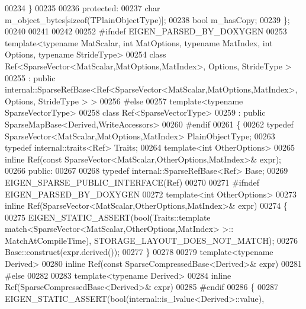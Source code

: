 \begin{DoxyCode}
00234     \}
00235 
00236   \textcolor{keyword}{protected}:
00237     \textcolor{keywordtype}{char} m\_object\_bytes[\textcolor{keyword}{sizeof}(TPlainObjectType)];
00238     \textcolor{keywordtype}{bool} m\_hasCopy;
00239 \};
00240 
00241 
00242 
00252 \textcolor{preprocessor}{#ifndef EIGEN\_PARSED\_BY\_DOXYGEN}
00253 \textcolor{keyword}{template}<\textcolor{keyword}{typename} MatScalar, \textcolor{keywordtype}{int} MatOptions, \textcolor{keyword}{typename} MatIndex, \textcolor{keywordtype}{int} Options, \textcolor{keyword}{typename} Str\textcolor{keywordtype}{id}eType>
00254 \textcolor{keyword}{class }Ref<SparseVector<MatScalar,MatOptions,MatIndex>, Options, StrideType >
00255   : \textcolor{keyword}{public} internal::SparseRefBase<Ref<SparseVector<MatScalar,MatOptions,MatIndex>, Options, StrideType > >
00256 \textcolor{preprocessor}{#else}
00257 template<typename SparseVectorType>
00258 class Ref<SparseVectorType>
00259   : \textcolor{keyword}{public} SparseMapBase<Derived,WriteAccessors>
00260 \textcolor{preprocessor}{#endif}
00261 \{
00262     \textcolor{keyword}{typedef} SparseVector<MatScalar,MatOptions,MatIndex> PlainObjectType;
00263     \textcolor{keyword}{typedef} internal::traits<Ref> Traits;
00264     \textcolor{keyword}{template}<\textcolor{keywordtype}{int} OtherOptions>
00265     \textcolor{keyword}{inline} Ref(\textcolor{keyword}{const} SparseVector<MatScalar,OtherOptions,MatIndex>& expr);
00266   \textcolor{keyword}{public}:
00267 
00268     \textcolor{keyword}{typedef} internal::SparseRefBase<Ref> Base;
00269     EIGEN\_SPARSE\_PUBLIC\_INTERFACE(Ref)
00270 
00271     \textcolor{preprocessor}{#ifndef EIGEN\_PARSED\_BY\_DOXYGEN}
00272     \textcolor{keyword}{template}<\textcolor{keywordtype}{int} OtherOptions>
00273     \textcolor{keyword}{inline} Ref(SparseVector<MatScalar,OtherOptions,MatIndex>& expr)
00274     \{
00275       EIGEN\_STATIC\_ASSERT(\textcolor{keywordtype}{bool}(Traits::template match<SparseVector<MatScalar,OtherOptions,MatIndex> >::
      MatchAtCompileTime), STORAGE\_LAYOUT\_DOES\_NOT\_MATCH);
00276       Base::construct(expr.derived());
00277     \}
00278 
00279     \textcolor{keyword}{template}<\textcolor{keyword}{typename} Derived>
00280     \textcolor{keyword}{inline} Ref(\textcolor{keyword}{const} SparseCompressedBase<Derived>& expr)
00281     \textcolor{preprocessor}{#else}
00282 
00283     \textcolor{keyword}{template}<\textcolor{keyword}{typename} Derived>
00284     \textcolor{keyword}{inline} Ref(SparseCompressedBase<Derived>& expr)
00285     \textcolor{preprocessor}{#endif}
00286     \{
00287       EIGEN\_STATIC\_ASSERT(\textcolor{keywordtype}{bool}(internal::is\_lvalue<Derived>::value), 

\end{DoxyCode}
